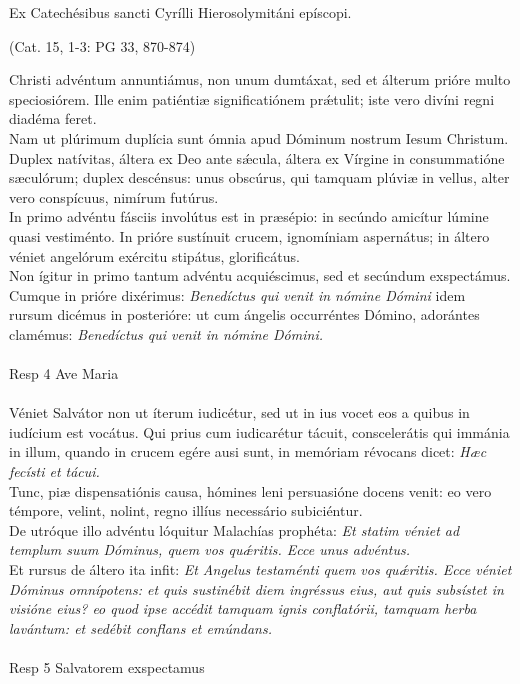 \documentclass[options]{article}
\begin{document}
	Ex Catechésibus sancti Cyrílli Hierosolymitáni epíscopi.
	\begin{flushright}
		(Cat. 15, 1-3: PG 33, 870-874)
	\end{flushright}
Christi advéntum annuntiámus, non unum dumtáxat, sed et álterum prióre multo speciosiórem. Ille enim patiéntiæ significatiónem pr\'{æ}tulit; iste vero divíni regni diadéma feret.\\
Nam ut plúrimum duplícia sunt ómnia apud Dóminum nostrum Iesum Christum. Duplex natívitas, áltera ex Deo ante s\'{æ}cula, áltera ex Vírgine in consummatióne sæculórum; duplex descénsus: unus obscúrus, qui tamquam plúviæ in vellus, alter vero conspícuus, nimírum futúrus.\\
In primo advéntu fásciis involútus est in præsépio: in secúndo amicítur lúmine quasi vestiménto. In prióre sustínuit crucem, ignomíniam aspernátus; in áltero véniet angelórum exércitu stipátus, glorificátus.\\
Non ígitur in primo tantum advéntu acquiéscimus, sed et secúndum exspectámus. Cumque in prióre dixérimus: \emph{Benedíctus qui venit in nómine Dómini} idem rursum dicémus in posterióre: ut cum ángelis occurréntes Dómino, adorántes clamémus: \emph{Benedíctus qui venit in nómine Dómini.}\\
\\
Resp 4  Ave Maria\\
\\
  Véniet Salvátor non ut íterum iudicétur, sed ut in ius vocet eos a quibus in iudícium est vocátus. Qui prius cum iudicarétur tácuit, conscelerátis qui immánia in illum, quando in crucem egére ausi sunt, in memóriam révocans dicet: \emph{Hæc fecísti et tácui.}\\
Tunc, piæ dispensatiónis causa, hómines leni persuasióne docens venit: eo vero témpore, velint, nolint, regno illíus necessário subiciéntur.\\
De utróque illo advéntu lóquitur Malachías prophéta: \emph{Et statim véniet ad templum suum Dóminus, quem vos qu\'{æ}ritis. Ecce unus advéntus.}\\
Et rursus de áltero ita infit: \emph{Et Angelus testaménti quem vos qu\'{æ}ritis. Ecce véniet Dóminus omnípotens: et quis sustinébit diem ingréssus eius, aut quis subsístet in visióne eius? eo quod ipse accédit tamquam ignis conflatórii, tamquam herba lavántum: et sedébit conflans et emúndans.}\\
\\
Resp 5 Salvatorem exspectamus\\
\\
\end{document}
